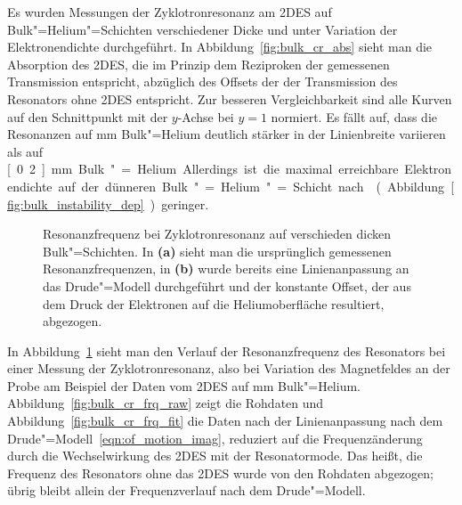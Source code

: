 Es wurden Messungen der Zyklotronresonanz am 2DES auf Bulk"=Helium"=Schichten verschiedener Dicke und unter Variation der Elektronendichte durchgeführt. In Abbildung~\ref{fig:bulk_cr_abs} sieht man die Absorption des 2DES, die im Prinzip dem Reziproken der gemessenen Transmission entspricht, abzüglich des Offsets der der Transmission des Resonators ohne 2DES entspricht. Zur besseren Vergleichbarkeit sind alle Kurven auf den Schnittpunkt mit der $y$-Achse bei $y=1$ normiert. Es fällt auf, dass die Resonanzen auf \unit[1]{mm} Bulk"=Helium deutlich stärker in der Linienbreite variieren als auf \unit[0.2]{mm} Bulk"=Helium. Allerdings ist die maximal erreichbare Elektronendichte auf der dünneren Bulk"=Helium"=Schicht nach \cite{Pee84} (Abbildung~\ref{fig:bulk_instability_dep}) geringer.

\begin{figure}[h!tbp]
	\begin{center}
	\end{center}
	\caption[Verhalten der Resonanzfrequenz bei Zyklotronresonanz]{Resonanzfrequenz bei Zyklotronresonanz auf verschieden dicken Bulk"=Schichten. In  {\bfseries (a)} sieht man die ursprünglich gemessenen Resonanzfrequenzen, in  {\bfseries (b)} wurde bereits eine Linienanpassung an das Drude"=Modell durchgeführt und der konstante Offset, der aus dem Druck der Elektronen auf die Heliumoberfläche resultiert, abgezogen.}
	\label{fig:bulk_cr_frq}
\end{figure}

In Abbildung~\ref{fig:bulk_cr_frq} sieht man den Verlauf der Resonanzfrequenz des Resonators bei einer Messung der Zyklotronresonanz, also bei Variation des Magnetfeldes an der Probe am Beispiel der Daten vom 2DES auf \unit[1]{mm} Bulk"=Helium. Abbildung~\ref{fig:bulk_cr_frq_raw} zeigt die Rohdaten und Abbildung~\ref{fig:bulk_cr_frq_fit} die Daten nach der Linienanpassung nach dem Drude"=Modell~\eqref{eqn:of_motion_imag}, reduziert auf die Frequenzänderung durch die Wechselwirkung des 2DES mit der Resonatormode. Das heißt, die Frequenz des Resonators ohne das 2DES wurde von den Rohdaten abgezogen; übrig bleibt allein der Frequenzverlauf nach dem Drude"=Modell.

